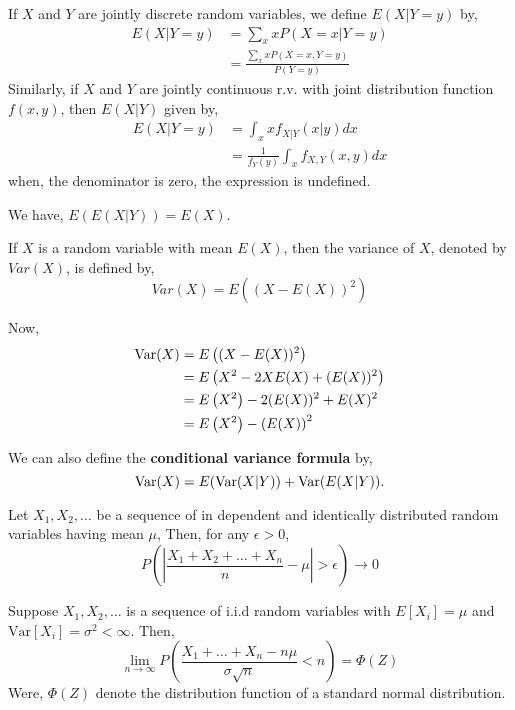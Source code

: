 \begin{definition}
    If $ X $ and $ Y $ are jointly discrete random variables, we define $ E(X|Y=y) $ by,
    \begin{align*}
        E(X|Y=y) &= \sum_{x}xP(X=x|Y=y)\\ 
                 &= \frac{\sum_{x}xP(X=x,Y=y) }{P(Y=y)}
    \end{align*}
    Similarly, if $ X $ and $ Y $ are jointly continuous r.v. with joint distribution function $ f(x,y) $, then $ E(X|Y) $ given by,
    \begin{align*}
        E(X|Y=y) &= \int_{x} x f_{X|Y}(x|y)dx \\
                 &= \frac{1}{f_Y(y)}\int_{x} f_{X,Y}(x,y)dx 
    \end{align*}
    when, the denominator is zero, the expression is undefined.
\end{definition}

We have, $ E\left( E(X|Y) \right) = E(X) $. 

\begin{definition}[Variance]
	If $ X $ is a random variable with mean $ E(X) $, then the variance of $ X $,
	denoted by $ Var(X) $, is defined by,
	\[
		Var(X)=E\left( (X-E(X))^{2} \right)
	\]
\end{definition}
Now, 
\begin{align*}
    \text{Var}(X) &= E\left((X-E(X))^{2}\right) \\ 
                &= E\left( X^{2} - 2XE(X) + (E(X))^{2} \right) \\
                &= E\left( X^{2} \right) - 2(E(X))^{2} + E(X)^{2} \\
                &= E\left( X^{2} \right) - \left( E(X) \right)^{2}
\end{align*}

We can also define the \textbf{conditional variance formula} by,
\[
    \text{Var}(X) = E(\text{Var}(X|Y)) + \text{Var}(E(X|Y)).
\]

\begin{theorem}
	Let $X_1,X_2,\ldots$ be a sequence of in dependent and identically distributed 
	random variables having mean $ \mu $, Then, for any $ \epsilon >0 $,
	\[
		P \left( \left|\frac{X_1+X_2+ \ldots + X_n }{n} - \mu \right| > \epsilon \right) \to 0 
	\]
\end{theorem}

\begin{theorem}
	Suppose $X_1, X_2, \ldots  $ is a sequence of i.i.d random variables with 
    $E[X_i]=\mu$ and $\text{Var}[X_i]=\sigma ^{2} < \infty$. Then, 
	\[
		\lim_{n \to \infty} P\left( \frac{X_1+\ldots+X_n - n\mu}{\sigma \sqrt{n } } < n \right) = \Phi(Z)
	\]
	Were, $\Phi(Z)$ denote the distribution function of a standard normal distribution.
\end{theorem}

